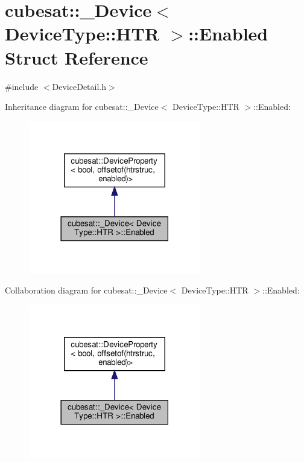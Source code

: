 \hypertarget{structcubesat_1_1__Device_3_01DeviceType_1_1HTR_01_4_1_1Enabled}{}\section{cubesat\+:\+:\+\_\+\+Device$<$ Device\+Type\+:\+:H\+TR $>$\+:\+:Enabled Struct Reference}
\label{structcubesat_1_1__Device_3_01DeviceType_1_1HTR_01_4_1_1Enabled}


{\ttfamily \#include $<$Device\+Detail.\+h$>$}



Inheritance diagram for cubesat\+:\+:\+\_\+\+Device$<$ Device\+Type\+:\+:H\+TR $>$\+:\+:Enabled\+:\nopagebreak
\begin{figure}[H]
\begin{center}
\leavevmode
\includegraphics[width=213pt]{structcubesat_1_1__Device_3_01DeviceType_1_1HTR_01_4_1_1Enabled__inherit__graph}
\end{center}
\end{figure}


Collaboration diagram for cubesat\+:\+:\+\_\+\+Device$<$ Device\+Type\+:\+:H\+TR $>$\+:\+:Enabled\+:\nopagebreak
\begin{figure}[H]
\begin{center}
\leavevmode
\includegraphics[width=213pt]{structcubesat_1_1__Device_3_01DeviceType_1_1HTR_01_4_1_1Enabled__coll__graph}
\end{center}
\end{figure}
